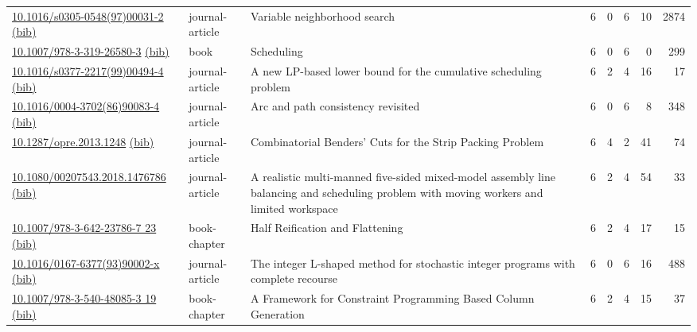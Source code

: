 {\begin{longtable}{p{5cm}lp{11cm}rrrrr}
\href{http://dx.doi.org/10.1016/s0305-0548(97)00031-2}{10.1016/s0305-0548(97)00031-2} \href{https://www.doi2bib.org/bib/10.1016/s0305-0548(97)00031-2}{(bib)} & journal-article & Variable neighborhood search & 6 & 0 & 6 & 10 & 2874 \\
\href{http://dx.doi.org/10.1007/978-3-319-26580-3}{10.1007/978-3-319-26580-3} \href{https://www.doi2bib.org/bib/10.1007/978-3-319-26580-3}{(bib)} & book & Scheduling & 6 & 0 & 6 & 0 & 299 \\
\href{http://dx.doi.org/10.1016/s0377-2217(99)00494-4}{10.1016/s0377-2217(99)00494-4} \href{https://www.doi2bib.org/bib/10.1016/s0377-2217(99)00494-4}{(bib)} & journal-article & A new LP-based lower bound for the cumulative scheduling problem & 6 & 2 & 4 & 16 & 17 \\
\href{http://dx.doi.org/10.1016/0004-3702(86)90083-4}{10.1016/0004-3702(86)90083-4} \href{https://www.doi2bib.org/bib/10.1016/0004-3702(86)90083-4}{(bib)} & journal-article & Arc and path consistency revisited & 6 & 0 & 6 & 8 & 348 \\
\href{http://dx.doi.org/10.1287/opre.2013.1248}{10.1287/opre.2013.1248} \href{https://www.doi2bib.org/bib/10.1287/opre.2013.1248}{(bib)} & journal-article & Combinatorial Benders' Cuts for the Strip Packing Problem & 6 & 4 & 2 & 41 & 74 \\
\href{http://dx.doi.org/10.1080/00207543.2018.1476786}{10.1080/00207543.2018.1476786} \href{https://www.doi2bib.org/bib/10.1080/00207543.2018.1476786}{(bib)} & journal-article & A realistic multi-manned five-sided mixed-model assembly line balancing and scheduling problem with moving workers and limited workspace & 6 & 2 & 4 & 54 & 33 \\
\href{http://dx.doi.org/10.1007/978-3-642-23786-7_23}{10.1007/978-3-642-23786-7 23} \href{https://www.doi2bib.org/bib/10.1007/978-3-642-23786-7_23}{(bib)} & book-chapter & Half Reification and Flattening & 6 & 2 & 4 & 17 & 15 \\
\href{http://dx.doi.org/10.1016/0167-6377(93)90002-x}{10.1016/0167-6377(93)90002-x} \href{https://www.doi2bib.org/bib/10.1016/0167-6377(93)90002-x}{(bib)} & journal-article & The integer L-shaped method for stochastic integer programs with complete recourse & 6 & 0 & 6 & 16 & 488 \\
\href{http://dx.doi.org/10.1007/978-3-540-48085-3_19}{10.1007/978-3-540-48085-3 19} \href{https://www.doi2bib.org/bib/10.1007/978-3-540-48085-3_19}{(bib)} & book-chapter & A Framework for Constraint Programming Based Column Generation & 6 & 2 & 4 & 15 & 37 \\

\end{longtable}}

